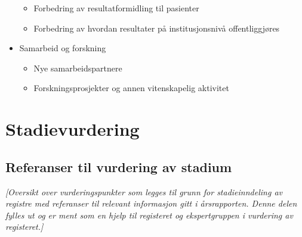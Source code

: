\documentclass[norsk, a4paper, twocolumn]{report}
\newcommand{\guide}[1] {
	\textit{[\textcolor{guidegray}{#1}]}
	}
\begin{document}
\begin{itemize}
\begin{itemize}
      \item Forbedring av resultatformidling til pasienter
      \item Forbedring av hvordan resultater på institusjonsnivå offentliggjøres
    \end{itemize}
  \item Samarbeid og forskning
    \begin{itemize}
      \item Nye samarbeidspartnere
      \item Forskningsprosjekter og annen vitenskapelig aktivitet
    \end{itemize}
\end{itemize}




\part{Stadievurdering}


\chapter{Referanser til vurdering av stadium}
\guide{Oversikt over vurderingspunkter som legges til grunn for
stadieinndeling av registre med referanser til relevant informasjon
gitt i årsrapporten. Denne delen fylles ut og er ment som en
hjelp til registeret og ekspertgruppen i vurdering av registeret.}

\bigskip
\bigskip
\end{document}
